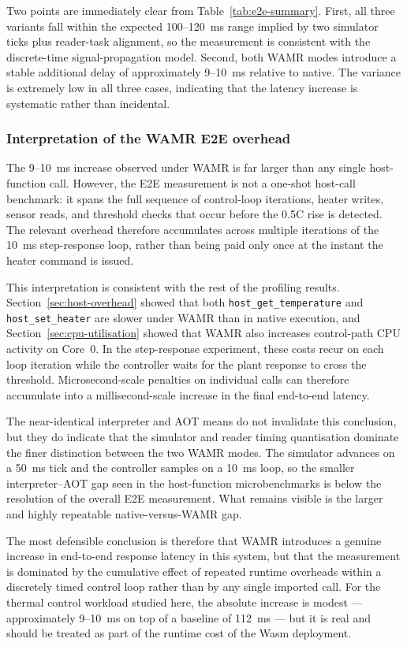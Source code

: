 \documentclass[12pt, a4paper]{report}
\begin{document}
Two points are immediately clear from Table~\ref{tab:e2e-summary}. First, all three variants fall within the expected 100--120~ms range implied by two simulator ticks plus reader-task alignment, so the measurement is consistent with the discrete-time signal-propagation model. Second, both WAMR modes introduce a stable additional delay of approximately 9--10~ms relative to native. The variance is extremely low in all three cases, indicating that the latency increase is systematic rather than incidental.

\subsubsection{Interpretation of the WAMR E2E overhead}
\label{subsec:e2e-analysis}

The 9--10~ms increase observed under WAMR is far larger than any single host-function call. However, the E2E measurement is not a one-shot host-call benchmark: it spans the full sequence of control-loop iterations, heater writes, sensor reads, and threshold checks that occur before the 0.5\textdegree C rise is detected. The relevant overhead therefore accumulates across multiple iterations of the 10~ms step-response loop, rather than being paid only once at the instant the heater command is issued.

This interpretation is consistent with the rest of the profiling results. Section~\ref{sec:host-overhead} showed that both \texttt{host\_get\_temperature} and \texttt{host\_set\_heater} are slower under WAMR than in native execution, and Section~\ref{sec:cpu-utilisation} showed that WAMR also increases control-path CPU activity on Core~0. In the step-response experiment, these costs recur on each loop iteration while the controller waits for the plant response to cross the threshold. Microsecond-scale penalties on individual calls can therefore accumulate into a millisecond-scale increase in the final end-to-end latency.

The near-identical interpreter and AOT means do not invalidate this conclusion, but they do indicate that the simulator and reader timing quantisation dominate the finer distinction between the two WAMR modes. The simulator advances on a 50~ms tick and the controller samples on a 10~ms loop, so the smaller interpreter--AOT gap seen in the host-function microbenchmarks is below the resolution of the overall E2E measurement. What remains visible is the larger and highly repeatable native-versus-WAMR gap.

The most defensible conclusion is therefore that WAMR introduces a genuine increase in end-to-end response latency in this system, but that the measurement is dominated by the cumulative effect of repeated runtime overheads within a discretely timed control loop rather than by any single imported call. For the thermal control workload studied here, the absolute increase is modest --- approximately 9--10~ms on top of a baseline of 112~ms --- but it is real and should be treated as part of the runtime cost of the Wasm deployment.
\end{document}
